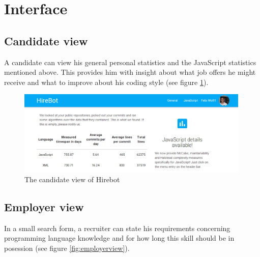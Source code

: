 %

\section{Interface}
\subsection{Candidate view}
A candidate can view his general personal statistics and the JavaScript statistics mentioned above. This provides him with insight about what job offers he might receive and what to improve about his coding style (see figure \ref{fig:candidateview}).

\begin{figure}
  \includegraphics[width=30em]{gfx/candidateview.png}
  \caption{The candidate view of Hirebot}
  \label{fig:candidateview}
\end{figure}

\subsection{Employer view}
In a small search form, a recruiter can state his requirements concerning programming language knowledge and for how long this skill should be in posession (see figure \ref{fig:employerview}).
